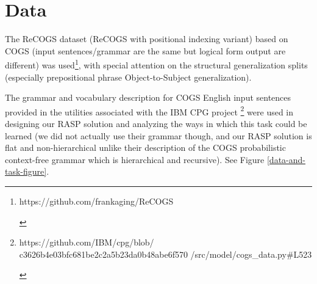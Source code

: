 \documentclass[11pt]{article}
\begin{document}
%
%
%

\section{Data}

The ReCOGS \cite{Wu2023} dataset (ReCOGS with positional indexing variant) based on COGS \cite{KimLinzen2020} (input sentences/grammar are the same but logical form output are different) was used\footnote{\begin{footnotesize}https://github.com/frankaging/ReCOGS
\end{footnotesize}}, with special attention on the structural generalization splits (especially prepositional phrase Object-to-Subject generalization).

The grammar and vocabulary description for COGS English input sentences provided in the utilities associated with the IBM CPG project \cite{klinger2024compositionalprogramgenerationfewshot}\footnote{\begin{footnotesize}https://github.com/IBM/cpg/blob/
c3626b4e03bfc681be2c2a5b23da0b48abe6f570
/src/model/cogs\_data.py\#L523
\end{footnotesize}}
were used in designing our RASP solution and analyzing the ways in which this task could be learned (we did not actually use their grammar though, and our RASP solution is flat and non-hierarchical unlike their description of the COGS probabilistic context-free grammar which is hierarchical and recursive). See Figure \ref{data-and-task-figure}.
\end{document}
